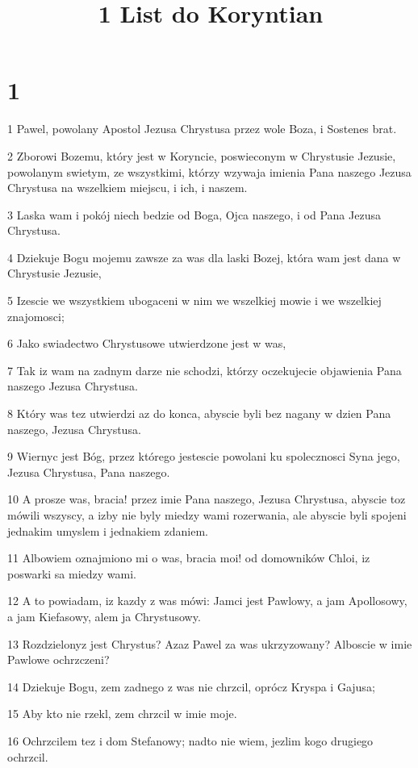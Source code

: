 

\title{1 List do Koryntian}


\chapter{1}

\par 1 Pawel, powolany Apostol Jezusa Chrystusa przez wole Boza, i Sostenes brat.
\par 2 Zborowi Bozemu, który jest w Koryncie, poswieconym w Chrystusie Jezusie, powolanym swietym, ze wszystkimi, którzy wzywaja imienia Pana naszego Jezusa Chrystusa na wszelkiem miejscu, i ich, i naszem.
\par 3 Laska wam i pokój niech bedzie od Boga, Ojca naszego, i od Pana Jezusa Chrystusa.
\par 4 Dziekuje Bogu mojemu zawsze za was dla laski Bozej, która wam jest dana w Chrystusie Jezusie,
\par 5 Izescie we wszystkiem ubogaceni w nim we wszelkiej mowie i we wszelkiej znajomosci;
\par 6 Jako swiadectwo Chrystusowe utwierdzone jest w was,
\par 7 Tak iz wam na zadnym darze nie schodzi, którzy oczekujecie objawienia Pana naszego Jezusa Chrystusa.
\par 8 Który was tez utwierdzi az do konca, abyscie byli bez nagany w dzien Pana naszego, Jezusa Chrystusa.
\par 9 Wiernyc jest Bóg, przez którego jestescie powolani ku spolecznosci Syna jego, Jezusa Chrystusa, Pana naszego.
\par 10 A prosze was, bracia! przez imie Pana naszego, Jezusa Chrystusa, abyscie toz mówili wszyscy, a izby nie byly miedzy wami rozerwania, ale abyscie byli spojeni jednakim umyslem i jednakiem zdaniem.
\par 11 Albowiem oznajmiono mi o was, bracia moi! od domowników Chloi, iz poswarki sa miedzy wami.
\par 12 A to powiadam, iz kazdy z was mówi: Jamci jest Pawlowy, a jam Apollosowy, a jam Kiefasowy, alem ja Chrystusowy.
\par 13 Rozdzielonyz jest Chrystus? Azaz Pawel za was ukrzyzowany? Alboscie w imie Pawlowe ochrzczeni?
\par 14 Dziekuje Bogu, zem zadnego z was nie chrzcil, oprócz Kryspa i Gajusa;
\par 15 Aby kto nie rzekl, zem chrzcil w imie moje.
\par 16 Ochrzcilem tez i dom Stefanowy; nadto nie wiem, jezlim kogo drugiego ochrzcil.
